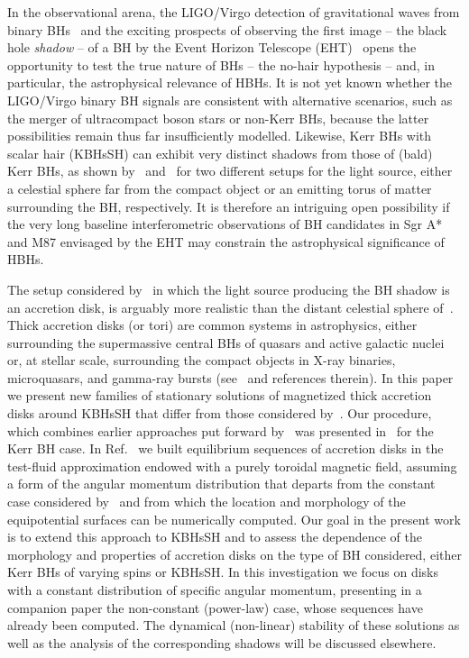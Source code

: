 \documentclass[twocolumn,aps,showpacs,showkeys,prd,superscriptaddress,byrevtex, amsmath]{revtex4-1}
\begin{document}
In the observational arena, the LIGO/Virgo detection of gravitational waves from binary BHs~\cite{Abbott2016, Abbott:2016nmj, Abbott:2017vtc, Abbott:2017oio, Abbott:2017gyy} and the exciting prospects of observing the first image -- the black hole {\it shadow} -- of a BH by the Event Horizon Telescope (EHT)~\cite{Fish:2016} opens the opportunity to test the true nature of BHs -- the no-hair hypothesis -- and, in particular, the astrophysical relevance of HBHs. It is not yet known whether the LIGO/Virgo binary BH signals are consistent with alternative scenarios, such as the merger of ultracompact boson stars or non-Kerr BHs, because the latter possibilities remain thus far insufficiently modelled. Likewise, Kerr BHs with scalar hair (KBHsSH) can exhibit very distinct shadows from those of (bald) Kerr BHs, as shown by~\cite{Cunha:2015} and~\cite{Vincent:2016} for two different setups for the light source, either a celestial sphere far from the compact object or an emitting torus of matter surrounding the BH, respectively. It is therefore an intriguing open possibility if the very long baseline interferometric observations of BH candidates in Sgr A* and M87 envisaged by the EHT may constrain the astrophysical significance of HBHs.

The setup considered by~\cite{Vincent:2016} in which the light source producing the BH shadow is an accretion disk, is arguably more realistic than the distant celestial sphere of~\cite{Cunha:2015}. Thick accretion disks (or tori) are common systems in astrophysics, either surrounding the supermassive central BHs of quasars and active galactic nuclei or, at  stellar scale, surrounding the compact objects in X-ray binaries, microquasars, and gamma-ray bursts (see~\cite{Abramowicz:2013} and references therein). In this paper we present new families of stationary solutions of magnetized thick accretion disks around KBHsSH that differ from those considered by~\cite{Vincent:2016}. Our procedure, which combines earlier approaches  put forward by~\cite{Komissarov:2006,Qian:2009} was presented in~\cite{Gimeno-Soler:2017} for the Kerr BH case. In Ref.~\cite{Gimeno-Soler:2017} we built equilibrium sequences of accretion disks  in the test-fluid approximation endowed with a purely toroidal magnetic field, assuming a form of the angular momentum distribution that departs from the constant case considered by~\cite{Komissarov:2006} and from which the location and morphology of the equipotential surfaces can be numerically computed. Our goal in the present work is to extend this approach to KBHsSH and to assess the dependence of the morphology and properties of accretion disks on the type of BH considered, either Kerr BHs of varying spins or KBHsSH. In this investigation we focus on disks with a constant distribution of specific angular momentum, presenting in a companion paper the non-constant (power-law) case, whose sequences have already been computed. The dynamical (non-linear) stability of these solutions as well as the analysis of the corresponding shadows will be discussed elsewhere.
\end{document}
